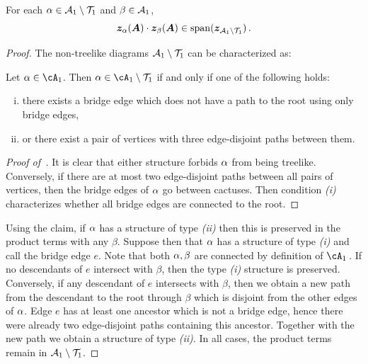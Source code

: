 \begin{lemma}\label{claim:only-trees}
    For each $\alpha \in {\cal A}_1 \setminus {\cal T}_1$ and $\beta \in {\cal A}_1$,
    \[
        {\bm z}_{\alpha}({\bm A}) \cdot {\bm z}_{\beta}({\bm A}) \in \operatorname{span}({\bm z}_{{\cal A}_1\setminus {\cal T}_1})\,.
    \]
\end{lemma}

\begin{proof}
    The non-treelike diagrams ${\cal A}_1 \setminus {\cal T}_1$ can be characterized as:
    \begin{claim}\label{claim:non-treelike}
    Let $\al \in \cA_1$. Then $\al \in \cA_1 \setminus \cT_1$ if and only if one of the following holds:
    \begin{enumerate}[(i)]
    \item there exists a bridge edge which does not have a path to the root using only bridge edges,
    \item or there exist a pair of vertices with three edge-disjoint paths between them.
    \end{enumerate}
    \end{claim}
    \begin{proof}[Proof of~]
        It is clear that either structure forbids $\alpha$ from being treelike. Conversely, if there are at most two edge-disjoint paths between all pairs of vertices, then the bridge edges of $\alpha$ go between cactuses.
        Then condition {\em (i)} characterizes whether all bridge edges are connected to the root.
    \end{proof}

    Using the claim, if $\alpha$ has a structure of type {\em (ii)} then this is preserved in the product terms with any $\beta$.
    Suppose then that $\alpha$ has a structure of type {\em (i)} and call the bridge edge $e$.
    Note that both $\alpha, \beta$ are connected by definition of $\cA_1$\,.
    If no descendants of $e$ intersect with $\beta$, then the type {\em (i)} structure is preserved.
    Conversely, if any descendant of $e$ intersects with $\beta$,
    then we obtain a new path from the descendant to the root through $\beta$ which is disjoint from the other edges of $\alpha$.
    Edge $e$ has at least one ancestor which is not a bridge edge, hence there were already two edge-disjoint paths containing this ancestor.
    Together with the new path we obtain a structure of type {\em (ii)}.
    In all cases, the product terms remain in ${\cal A}_1 \setminus {\cal T}_1$.
\end{proof}

